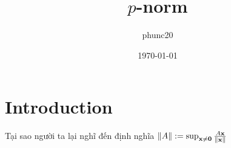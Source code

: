 \documentclass{article}
\title{$p$-norm}
\author{phunc20}
\date{\today}
\begin{document}
\maketitle

\section{Introduction}


Tại sao người ta lại nghĩ đến định nghĩa $\Vert A \Vert := \sup_{\bold{x} \ne \bold{0}} \frac{A\bold{x}}{\Vert \bold{x} \Vert}$
\end{document}
